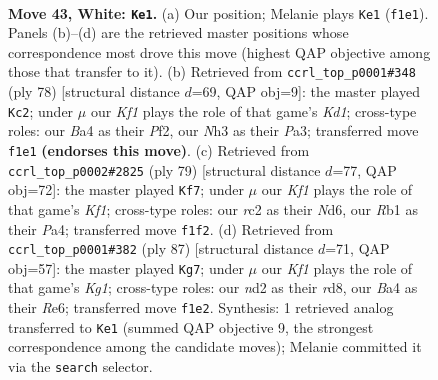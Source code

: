 \documentclass[11pt]{article}
\begin{document}
\clearpage

\begin{figure}[p]\centering
\begin{subfigure}{0.46\textwidth}\centering
\resizebox{\linewidth}{!}{%
\newchessgame
\chessboard[
  setfen={2b3k1/1q3p1p/6p1/4Pp2/BQ3P2/7N/P1rn2PP/1R3K2 w - - 1 43},
  showmover=false,
  pgfstyle=straightmove, color=movearrow, markmove={f1-e1}
]}
\caption{}
\end{subfigure}\hfill
\begin{subfigure}{0.46\textwidth}\centering
\resizebox{\linewidth}{!}{%
\newchessgame
\chessboard[
  setfen={5bk1/2BP1pp1/p6p/2p1r3/4n3/P2Q2N1/5Pq1/R2K4 w - - 0 40},
  showmover=false,
  pgfstyle=straightmove, color=movearrow, markmove={d1-c2}
]}
\caption{}
\end{subfigure}
\\[4pt]
\begin{subfigure}{0.46\textwidth}\centering
\resizebox{\linewidth}{!}{%
\newchessgame
\chessboard[
  setfen={5k2/q2N2p1/3n1p1p/2p5/p1b2PQ1/7P/PR4PK/B3r3 b - - 1 40},
  showmover=false,
  pgfstyle=straightmove, color=movearrow, markmove={f8-f7}
]}
\caption{}
\end{subfigure}\hfill
\begin{subfigure}{0.46\textwidth}\centering
\resizebox{\linewidth}{!}{%
\newchessgame
\chessboard[
  setfen={3R2k1/2q2p2/p3rnp1/1pB5/1P6/P2Q1NP1/1b4KP/8 b - - 5 44},
  showmover=false,
  pgfstyle=straightmove, color=movearrow, markmove={g8-g7}
]}
\caption{}
\end{subfigure}
\caption{\textbf{Move 43, White: \texttt{Ke1}.} (a) Our position; Melanie plays \texttt{Ke1} (\texttt{f1e1}). Panels (b)--(d) are the retrieved master positions whose correspondence most drove this move (highest QAP objective among those that transfer to it). (b) Retrieved from \texttt{ccrl\_top\_p0001\#348} (ply 78) [structural distance $d$=69, QAP obj=9]: the master played \texttt{Kc2}; under $\mu$ our \emph{Kf1} plays the role of that game's \emph{Kd1}; cross-type roles: our \emph{B}a4 as their \emph{P}f2, our \emph{N}h3 as their \emph{P}a3; transferred move \texttt{f1e1} \textbf{(endorses this move)}. (c) Retrieved from \texttt{ccrl\_top\_p0002\#2825} (ply 79) [structural distance $d$=77, QAP obj=72]: the master played \texttt{Kf7}; under $\mu$ our \emph{Kf1} plays the role of that game's \emph{Kf1}; cross-type roles: our \emph{r}c2 as their \emph{N}d6, our \emph{R}b1 as their \emph{P}a4; transferred move \texttt{f1f2}. (d) Retrieved from \texttt{ccrl\_top\_p0001\#382} (ply 87) [structural distance $d$=71, QAP obj=57]: the master played \texttt{Kg7}; under $\mu$ our \emph{Kf1} plays the role of that game's \emph{Kg1}; cross-type roles: our \emph{n}d2 as their \emph{r}d8, our \emph{B}a4 as their \emph{R}e6; transferred move \texttt{f1e2}. Synthesis: 1 retrieved analog transferred to \texttt{Ke1} (summed QAP objective 9, the strongest correspondence among the candidate moves); Melanie committed it via the \texttt{search} selector.}
\label{fig:thought-m84}
\end{figure}
\end{document}
